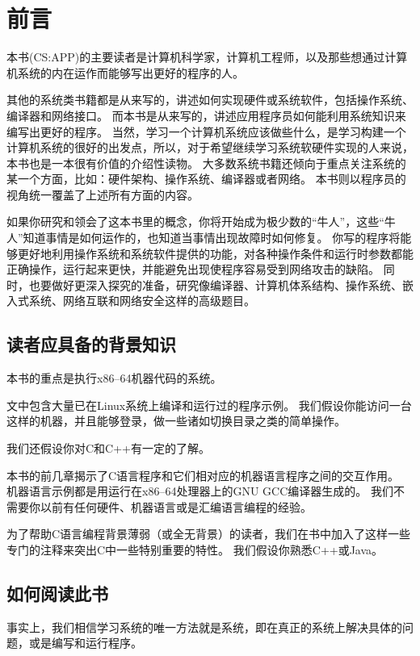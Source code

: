 \chapter{前言}
{
    本书(CS:APP)的主要读者是计算机科学家，计算机工程师，以及那些想通过计算机系统的内在运作而能够写出更好的程序的人。

    其他的系统类书籍都是从来写的，讲述如何实现硬件或系统软件，包括操作系统、编译器和网络接口。
    而本书是从来写的，讲述应用程序员如何能利用系统知识来编写出更好的程序。
    当然，学习一个计算机系统应该做些什么，是学习构建一个计算机系统的很好的出发点，所以，对于希望继续学习系统软硬件实现的人来说，本书也是一本很有价值的介绍性读物。
    大多数系统书籍还倾向于重点关注系统的某一个方面，比如：硬件架构、操作系统、编译器或者网络。
    本书则以程序员的视角统一覆盖了上述所有方面的内容。

    如果你研究和领会了这本书里的概念，你将开始成为极少数的``牛人''，这些``牛人''知道事情是如何运作的，也知道当事情出现故障时如何修复。
    你写的程序将能够更好地利用操作系统和系统软件提供的功能，对各种操作条件和运行时参数都能正确操作，运行起来更快，并能避免出现使程序容易受到网络攻击的缺陷。
    同时，也要做好更深入探究的准备，研究像编译器、计算机体系结构、操作系统、嵌入式系统、网络互联和网络安全这样的高级题目。

    \section{读者应具备的背景知识}
    {
        本书的重点是执行x86--64机器代码的系统。

        文中包含大量已在Linux系统上编译和运行过的程序示例。
        我们假设你能访问一台这样的机器，并且能够登录，做一些诸如切换目录之类的简单操作。

        我们还假设你对C和C++有一定的了解。

        本书的前几章揭示了C语言程序和它们相对应的机器语言程序之间的交互作用。
        机器语言示例都是用运行在x86--64处理器上的GNU GCC编译器生成的。
        我们不需要你以前有任何硬件、机器语言或是汇编语言编程的经验。

        {
            为了帮助C语言编程背景薄弱（或全无背景）的读者，我们在书中加入了这样一些专门的注释来突出C中一些特别重要的特性。
            我们假设你熟悉C++或Java。
        }
    }

    \section{如何阅读此书}
    {
        事实上，我们相信学习系统的唯一方法就是系统，即在真正的系统上解决具体的问题，或是编写和运行程序。

}}

